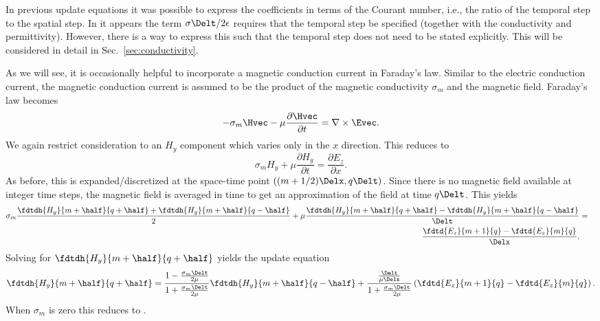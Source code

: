 In previous update equations it was possible to express the
coefficients in terms of the Courant number, i.e., the ratio of the
temporal step to the spatial step.  In  it
appears the term $\sigma\Delt/2\epsilon$ requires that the temporal
step be specified (together with the conductivity and permittivity).
However, there is a way to express this such that the temporal step
does not need to be stated explicitly.  This will be considered in
detail in Sec.\ \ref{sec:conductivity}.

As we will see, it is occasionally helpful to incorporate a magnetic
conduction current in Faraday's law.  Similar to the electric
conduction current, the magnetic conduction current is assumed to be
the product of the magnetic conductivity $\sigma_m$ and the magnetic
field.  Faraday's law becomes
\begin{equation}
  -\sigma_m\Hvec - \mu \frac{\partial \Hvec}{\partial t} =
  \nabla \times \Evec.
\end{equation}
We again restrict consideration to an $H_y$ component which varies
only in the $x$ direction.  This reduces to
\begin{equation}
  \sigma_m H_y + \mu \frac{\partial H_y}{\partial t} =
    \frac{\partial E_z}{\partial x}.
  \label{eq:faradayLoss}
\end{equation}
As before, this is expanded/discretized at the space-time point
$((m+1/2)\Delx,q\Delt)$.  Since there is no magnetic field available
at integer time steps, the magnetic field is averaged in time to
get an approximation of the field at time $q\Delt$.  This yields
\begin{eqnarray}
  \sigma_m\frac{\fdtdh{H_y}{m+\half}{q+\half}+\fdtdh{H_y}{m+\half}{q-\half}}{2} +
  \mu\frac{\fdtdh{H_y}{m+\half}{q+\half} - \fdtdh{H_y}{m+\half}{q-\half}}{\Delt}
  &=& \nonumber\\
  \frac{\fdtd{E_z}{m+1}{q} - \fdtd{E_z}{m}{q}}{\Delx}. &&
\end{eqnarray}
Solving for $\fdtdh{H_y}{m+\half}{q+\half}$ yields the update equation
\begin{equation}
  \fdtdh{H_y}{m+\half}{q+\half}=
  \frac{1-\frac{\sigma_m\Delt}{2\mu}}{1+\frac{\sigma_m\Delt}{2\mu}}
  \fdtdh{H_y}{m+\half}{q-\half} +
  \frac{\frac{\Delt}{\mu\Delx}}{1+\frac{\sigma_m\Delt}{2\mu}}
  \left(\fdtd{E_z}{m+1}{q} - \fdtd{E_z}{m}{q}\right).
  \label{eq:updateHyLoss}
\end{equation}
When $\sigma_m$ is zero this reduces to .

